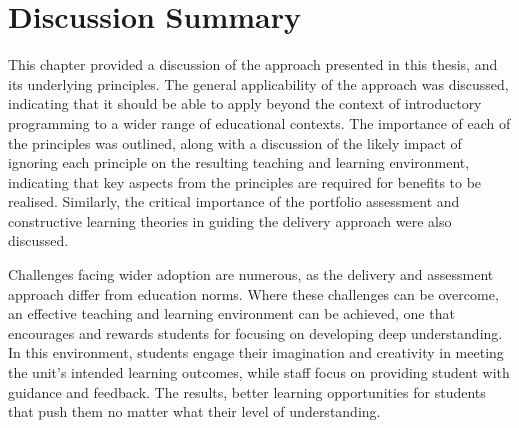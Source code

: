 

\section{Discussion Summary} %
\label{sec:disc_summary}

This chapter provided a discussion of the approach presented in this thesis, and its underlying principles. The general applicability of the approach was discussed, indicating that it should be able to apply beyond the context of introductory programming to a wider range of educational contexts. The importance of each of the principles was outlined, along with a discussion of the likely impact of ignoring each principle on the resulting teaching and learning environment, indicating that key aspects from the principles are required for benefits to be realised. Similarly, the critical importance of the portfolio assessment and constructive learning theories in guiding the delivery approach were also discussed.

Challenges facing wider adoption are numerous, as the delivery and assessment approach differ from education norms. Where these challenges can be overcome, an effective teaching and learning environment can be achieved, one that encourages and rewards students for focusing on developing deep understanding. In this environment, students engage their imagination and creativity in meeting the unit's intended learning outcomes, while staff focus on providing student with guidance and feedback. The results, better learning opportunities for students that push them no matter what their level of understanding.





